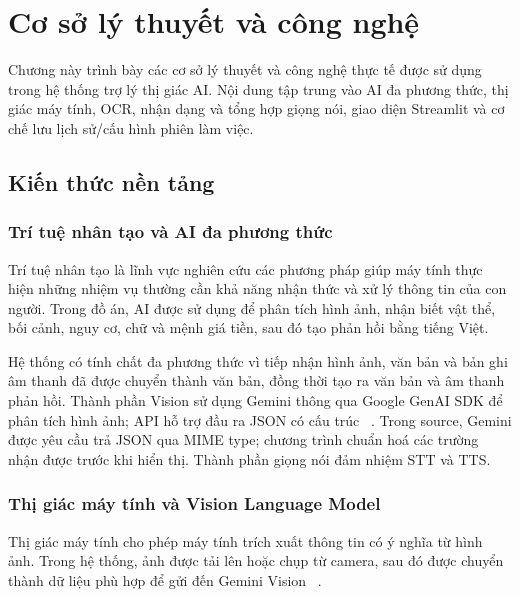 \chapter{Cơ sở lý thuyết và công nghệ}
\label{ch:coso}

\begin{muctieu}
Chương này trình bày các cơ sở lý thuyết và công nghệ thực tế được sử dụng
trong hệ thống trợ lý thị giác AI. Nội dung tập trung vào AI đa phương thức,
thị giác máy tính, OCR, nhận dạng và tổng hợp giọng nói, giao diện Streamlit
và cơ chế lưu lịch sử/cấu hình phiên làm việc.
\end{muctieu}

\section{Kiến thức nền tảng}

\subsection{Trí tuệ nhân tạo và AI đa phương thức}

Trí tuệ nhân tạo  là lĩnh vực nghiên cứu
các phương pháp giúp máy tính thực hiện những nhiệm vụ thường cần khả năng
nhận thức và xử lý thông tin của con người. Trong đồ án, AI được sử dụng để
phân tích hình ảnh, nhận biết vật thể, bối cảnh, nguy cơ, chữ và mệnh giá tiền,
sau đó tạo phản hồi bằng tiếng Việt.

Hệ thống có tính chất đa phương thức vì tiếp nhận hình ảnh, văn bản và bản ghi
âm thanh đã được chuyển thành văn bản, đồng thời tạo ra văn bản và âm thanh phản
hồi. Thành phần Vision sử dụng Gemini thông qua Google GenAI SDK để phân tích
hình ảnh; API hỗ trợ đầu ra JSON có cấu trúc
~\cite{GoogleGeminiVision2026,GoogleGeminiStructuredOutput2026,GoogleGenAIPython2026}.
Trong source, Gemini được yêu cầu trả JSON qua MIME type; chương trình chuẩn hoá
các trường nhận được trước khi hiển thị. Thành phần giọng nói đảm nhiệm STT và TTS.

\subsection{Thị giác máy tính và Vision Language Model}

Thị giác máy tính  cho phép máy tính trích xuất thông tin
có ý nghĩa từ hình ảnh. Trong hệ thống, ảnh được tải lên hoặc chụp từ camera,
sau đó được chuyển thành dữ liệu phù hợp để gửi đến Gemini Vision
~\cite{PillowImageModule2026}.

